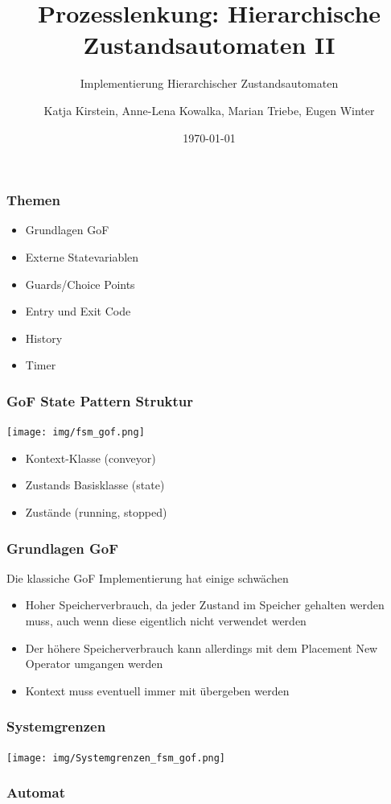 \documentclass{beamer}
\title{Prozesslenkung: Hierarchische Zustandsautomaten II}
\subtitle{Implementierung Hierarchischer Zustandsautomaten}
\author{Katja Kirstein, Anne-Lena Kowalka, Marian Triebe, Eugen Winter}
\date{\today}
\begin{document}
\begin{frame}
\titlepage
\end{frame}

\begin{frame}
 \frametitle{Themen}
 \begin{itemize}
  \item Grundlagen GoF
  \item Externe Statevariablen
  \item Guards/Choice Points
  \item Entry und Exit Code
  \item History
  \item Timer
 \end{itemize}
\end{frame}

\begin{frame}
 \frametitle{GoF State Pattern Struktur}
 \texttt{[image: img/fsm\_gof.png]}
 \begin{itemize}
  \item Kontext-Klasse (conveyor)
  \item Zustands Basisklasse (state)
  \item Zust\"ande (running, stopped)
 \end{itemize}
\end{frame}

\begin{frame}
 \frametitle{Grundlagen GoF}
 Die klassiche GoF Implementierung hat einige schw\"achen
 \begin{itemize}
  \item Hoher Speicherverbrauch, da jeder Zustand im Speicher gehalten werden muss, auch wenn diese eigentlich nicht verwendet werden
  \item Der h\"ohere Speicherverbrauch kann allerdings mit dem Placement New Operator umgangen werden
  \item Kontext muss eventuell immer mit \"ubergeben werden
 \end{itemize}
\end{frame}

\begin{frame}
 \frametitle{Systemgrenzen}
 \texttt{[image: img/Systemgrenzen\_fsm\_gof.png]}
\end{frame}

\begin{frame}
 \frametitle{Automat}
\end{frame}
\end{document}
